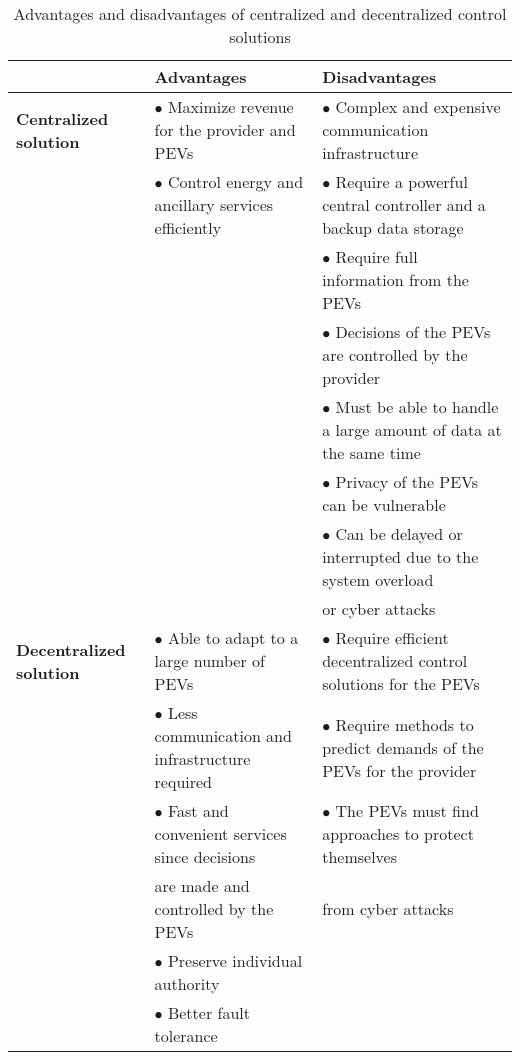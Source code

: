 \documentclass[twocolumn,10pt]{IEEEtran}
\begin{document}
\begin{table*}[t]
	\caption{Advantages and disadvantages of centralized and decentralized control solutions} %
	\centering %
	\begin{tabular}{|l|l|l|}
		\hline
		&\textbf{Advantages}&\textbf{Disadvantages}\\
		\hline
		\hline
		\textbf{Centralized solution} & $\bullet$ Maximize revenue for the provider and PEVs& $\bullet$ Complex and expensive communication infrastructure \\
									& $\bullet$ Control energy and ancillary services efficiently & $\bullet$ Require a powerful central controller and a backup data storage \\
									& &	$\bullet$ Require full information from the PEVs \\
									& &	$\bullet$ Decisions of the PEVs are controlled by the provider \\
									& &	$\bullet$ Must be able to handle a large amount of data at the same time \\
									& &	$\bullet$ Privacy of the PEVs can be vulnerable \\
									& &	$\bullet$ Can be delayed or interrupted due to the system overload  \\
									& & or cyber attacks \\
		\hline		
		\textbf{Decentralized solution} & $\bullet$ Able to adapt to a large number of PEVs  & $\bullet$ Require efficient decentralized control solutions for the PEVs \\
										& $\bullet$ Less communication and infrastructure required  & $\bullet$ Require methods to predict demands of the PEVs for the provider \\
										& $\bullet$ Fast and convenient services since decisions &  $\bullet$ The PEVs must find approaches to protect themselves   \\
										& are made and controlled by the PEVs   &  from cyber attacks \\
										& $\bullet$ Preserve individual authority  &  \\
										& $\bullet$ Better fault tolerance   &  \\
		\hline
	\end{tabular}
	\label{tab:smart_control}
\end{table*}





\end{document}
